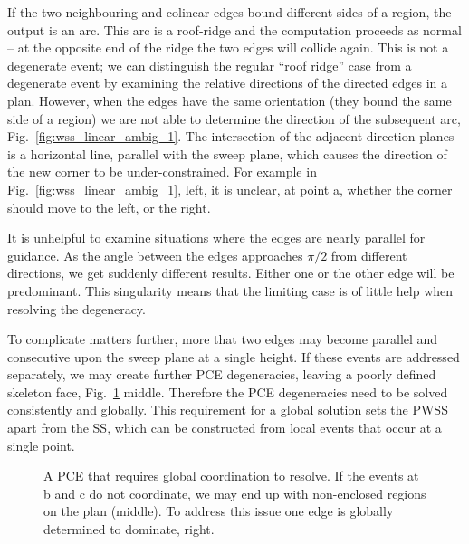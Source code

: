 If the two neighbouring and colinear edges bound different sides of a region, the output is an arc. This arc is a roof-ridge and the computation proceeds as normal -- at the opposite end of the ridge the two edges will collide again. This is not a degenerate event; we can distinguish the regular ``roof ridge'' case from a degenerate event by examining the relative directions of the directed edges in a plan. However, when the edges have the same orientation (they bound the same side of a region) we are not able to determine the direction of the subsequent arc, Fig.~\ref{fig:wss_linear_ambig_1}. The intersection of the adjacent direction planes is a horizontal line, parallel with the sweep plane, which causes the direction of the new corner to be under-constrained. For example in Fig.~\ref{fig:wss_linear_ambig_1}, left, it is unclear, at point a, whether the corner should move to the left, or the right.

It is unhelpful to examine situations where the edges are nearly parallel for guidance. As the angle between the edges approaches $\pi/2$ from different directions, we get suddenly different results. Either one or the other edge will be predominant. This singularity means that the limiting case is of little help when resolving the degeneracy.

To complicate matters further, more that two edges may become parallel and consecutive upon the sweep plane at a single height. If these events are addressed separately, we may create further PCE degeneracies, leaving a poorly defined skeleton face, Fig.~\ref{fig:wss_linear_ambig_2} middle. Therefore the PCE degeneracies need to be solved consistently and globally. This requirement for a global solution sets the PWSS apart from the SS, which can be constructed from local events that occur at a single point.


\begin{figure}
  \centering
  \def\svgwidth{1.0\columnwidth}
  
  \caption[Global coordination requirement in PCEs]{\label{fig:wss_linear_ambig_2} A PCE that requires global coordination to resolve. If the events at b and c do not coordinate, we may end up with non-enclosed regions on the plan (middle). To address this issue one edge is globally determined to dominate, right.}
\end{figure}

